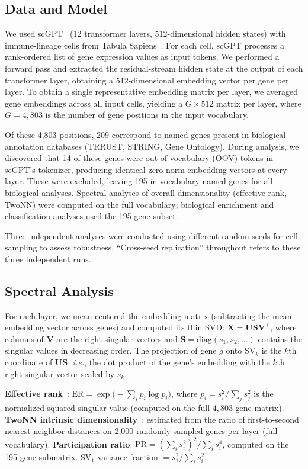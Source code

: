 \documentclass[10pt,twocolumn]{article}
\newcommand{\SV}[1]{\mathrm{SV}_{#1}}
\newcommand{\ie}{\textit{i.e.}}
\begin{document}
\subsection{Data and Model}
We used scGPT~\citep{cui2024scgpt} (12 transformer layers, 512-dimensional hidden states) with immune-lineage cells from Tabula Sapiens~\citep{jones2022tabula}.
For each cell, scGPT processes a rank-ordered list of gene expression values as input tokens.
We performed a forward pass and extracted the residual-stream hidden state at the output of each transformer layer, obtaining a 512-dimensional embedding vector per gene per layer.
To obtain a single representative embedding matrix per layer, we averaged gene embeddings across all input cells, yielding a $G \times 512$ matrix per layer, where $G = 4{,}803$ is the number of gene positions in the input vocabulary.

Of these 4{,}803 positions, 209 correspond to named genes present in biological annotation databases (TRRUST, STRING, Gene Ontology).
During analysis, we discovered that 14 of these genes were out-of-vocabulary (OOV) tokens in scGPT's tokenizer, producing identical zero-norm embedding vectors at every layer.
These were excluded, leaving 195 in-vocabulary named genes for all biological analyses.
Spectral analyses of overall dimensionality (effective rank, TwoNN) were computed on the full vocabulary; biological enrichment and classification analyses used the 195-gene subset.

Three independent analyses were conducted using different random seeds for cell sampling to assess robustness.
``Cross-seed replication'' throughout refers to these three independent runs.

\subsection{Spectral Analysis}
For each layer, we mean-centered the embedding matrix (subtracting the mean embedding vector across genes) and computed its thin SVD: $\mathbf{X} = \mathbf{U} \mathbf{S} \mathbf{V}^\top$, where columns of $\mathbf{V}$ are the right singular vectors and $\mathbf{S} = \mathrm{diag}(s_1, s_2, \ldots)$ contains the singular values in decreasing order.
The projection of gene $g$ onto $\SV{k}$ is the $k$th coordinate of $\mathbf{U}\mathbf{S}$, \ie, the dot product of the gene's embedding with the $k$th right singular vector scaled by $s_k$.

\textbf{Effective rank}~\citep{roy2007effective}: $\mathrm{ER} = \exp\!\bigl(-\sum_i p_i \log p_i\bigr)$, where $p_i = s_i^2 / \sum_j s_j^2$ is the normalized squared singular value (computed on the full $4{,}803$-gene matrix).
\textbf{TwoNN intrinsic dimensionality}~\citep{facco2017estimating}: estimated from the ratio of first-to-second nearest-neighbor distances on 2{,}000 randomly sampled genes per layer (full vocabulary).
\textbf{Participation ratio}: $\mathrm{PR} = (\sum_i s_i^2)^2 / \sum_i s_i^4$, computed on the 195-gene submatrix.
$\SV{1}$ variance fraction $= s_1^2 / \sum_i s_i^2$.
\end{document}
